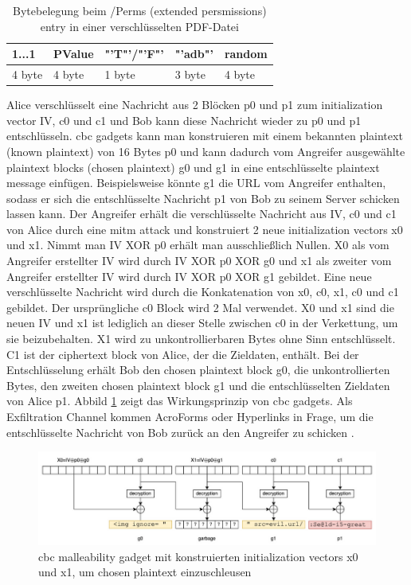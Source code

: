 \begin{table}[!htbp]
	\centering
	\begin{tabular}{|p{2cm}|p{2cm}|p{2cm}|p{2cm}|p{2cm}|}
	\hline
	\textbf{1...1}	& \textbf{PValue} 	& \textbf{"'T"'/"'F"'} 	& \textbf{"'adb"'} 	& \textbf{random} 	\\ 
	\hline
	4 byte 			& 4 byte 			& 1 byte  			& 3 byte 			& 4 byte 			\\ 
	\hline
	\end{tabular}
	\caption{Bytebelegung beim /Perms (extended persmissions) entry in einer verschlüsselten PDF-Datei \cite{ccc-break-pdf}}
	\label{table:perms}
\end{table}

Alice verschlüsselt eine Nachricht aus 2 Blöcken p0 und p1 zum initialization vector IV, c0 und c1 und Bob kann diese Nachricht wieder zu p0 und p1 entschlüsseln. \gls{cbc} gadgets kann man konstruieren mit einem bekannten plaintext (known plaintext) von 16 Bytes p0 und kann dadurch vom Angreifer ausgewählte plaintext blocks (chosen plaintext) g0 und g1 in eine entschlüsselte plaintext message einfügen. Beispielsweise könnte g1 die URL vom Angreifer enthalten, sodass er sich die entschlüsselte Nachricht p1 von Bob zu seinem Server schicken lassen kann. Der Angreifer erhält die verschlüsselte Nachricht aus IV, c0 und c1 von Alice durch eine \gls{mitm} attack und konstruiert 2 neue initialization vectors x0 und x1. Nimmt man IV XOR p0 erhält man ausschließlich Nullen. X0 als vom Angreifer erstellter IV wird durch IV XOR p0 XOR g0 und x1 als zweiter vom Angreifer erstellter IV wird durch IV XOR p0 XOR g1 gebildet. Eine neue verschlüsselte Nachricht wird durch die Konkatenation von x0, c0, x1, c0 und c1 gebildet. Der ursprüngliche c0 Block wird 2 Mal verwendet. X0 und x1 sind die neuen IV und x1 ist lediglich an dieser Stelle zwischen c0 in der Verkettung, um sie beizubehalten. X1 wird zu unkontrollierbaren Bytes ohne Sinn entschlüsselt. C1 ist der ciphertext block von Alice, der die Zieldaten, enthält. Bei der Entschlüsselung erhält Bob den chosen plaintext block g0, die unkontrollierten Bytes, den zweiten chosen plaintext block g1 und die entschlüsselten Zieldaten von Alice p1. Abbild \ref{fig:gadget} zeigt das Wirkungsprinzip von \gls{cbc} gadgets. Als Exfiltration Channel kommen AcroForms oder Hyperlinks in Frage, um die entschlüsselte Nachricht von Bob zurück an den Angreifer zu schicken \cite{gadget, ccc-break-pdf, crypto-web}.
\par

\begin{figure}[!htbp]
	\centering
	\includegraphics[width=1\textwidth]{"images/gadget2-gadget.png"}
	\caption{\gls{cbc} malleability gadget mit konstruierten initialization vectors x0 und x1, um chosen plaintext einzuschleusen \cite{gadget}}
	\label{fig:gadget}
\end{figure}

